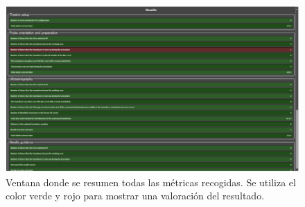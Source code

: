\begin{figure}[h]
    \centering
    \includegraphics[width=\textwidth]{IMG/resultui.PNG}
    \caption{Ventana donde se resumen todas las métricas recogidas. Se utiliza el color verde y rojo para mostrar una valoración del resultado.}
    \label{fig:resultui}
\end{figure}










